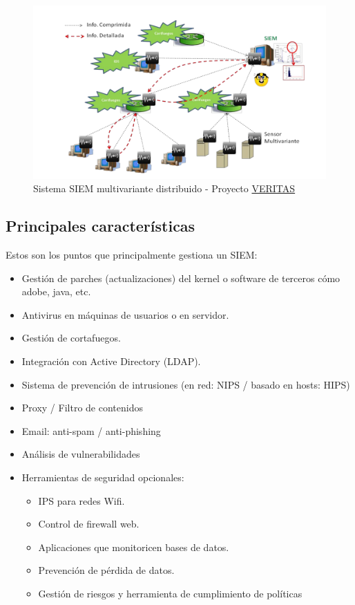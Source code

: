\begin{figure}[H]
  \includegraphics[scale=.4]{diagramas/siem.png}
  \caption{Sistema SIEM multivariante distribuido - Proyecto \href{http://nesg.ugr.es/veritas}{VERITAS}}
\end{figure}

\subsection{Principales características}

Estos son los puntos que principalmente gestiona un SIEM:\\

\begin{itemize}
\item Gestión de parches (actualizaciones) del kernel o software de terceros cómo adobe, java, etc.
\item Antivirus en máquinas de usuarios o en servidor.
\item Gestión de cortafuegos.
\item Integración con Active Directory (LDAP).
\item Sistema de prevención de intrusiones (en red: NIPS / basado en hosts: HIPS)
\item Proxy / Filtro de contenidos
\item Email: anti-spam / anti-phishing
\item Análisis de vulnerabilidades
\item Herramientas de seguridad opcionales:
  \begin{itemize}
  \item IPS para redes Wifi.
  \item Control de firewall web.
  \item Aplicaciones que monitoricen bases de datos.
  \item Prevención de pérdida de datos.
  \item Gestión de riesgos y herramienta de cumplimiento de políticas
  \end{itemize}
\end{itemize}

